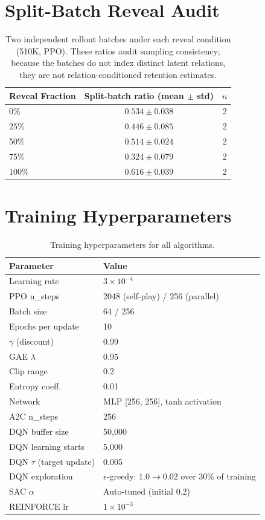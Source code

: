 \documentclass[letterpaper]{article}
\begin{document}
\section{Split-Batch Reveal Audit}

\begin{table}[H]
\centering
\small
\begin{tabular}{lcc}
\toprule
Reveal Fraction & Split-batch ratio (mean $\pm$ std) & $n$ \\
\midrule
0\%   & $0.534 \pm 0.038$ & 2 \\
25\%  & $0.446 \pm 0.085$ & 2 \\
50\%  & $0.514 \pm 0.024$ & 2 \\
75\%  & $0.324 \pm 0.079$ & 2 \\
100\% & $0.616 \pm 0.039$ & 2 \\
\bottomrule
\end{tabular}
\caption{Two independent rollout batches under each reveal condition
(510K, PPO). These ratios audit sampling consistency; because the batches
do not index distinct latent relations, they are not relation-conditioned
retention estimates.}
\end{table}

\section{Training Hyperparameters}

\begin{table}[H]
\centering
\footnotesize
\begin{tabular}{@{}lp{}@{}}
\toprule
Parameter & Value \\
\midrule
Learning rate     & $3 \times 10^{-4}$ \\
PPO n\_steps      & 2048 (self-play) / 256 (parallel) \\
Batch size        & 64 / 256 \\
Epochs per update & 10 \\
$\gamma$ (discount) & 0.99 \\
GAE $\lambda$     & 0.95 \\
Clip range        & 0.2 \\
Entropy coeff.    & 0.01 \\
Network           & MLP [256, 256], tanh activation \\
A2C n\_steps      & 256 \\
DQN buffer size   & 50,000 \\
DQN learning starts & 5,000 \\
DQN $\tau$ (target update) & 0.005 \\
DQN exploration   & $\epsilon$-greedy: $1.0 \to 0.02$ over 30\% of training \\
SAC $\alpha$      & Auto-tuned (initial 0.2) \\
REINFORCE lr      & $1 \times 10^{-3}$ \\
\bottomrule
\end{tabular}
\caption{Training hyperparameters for all algorithms.}
\end{table}
\end{document}

